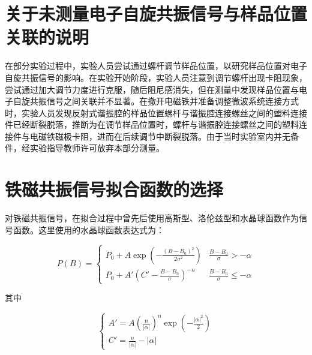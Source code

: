 \documentclass{thuemp}
\begin{document}
    {
    \renewcommand{\baselinestretch}{0.9}
    \liuhao
    
    
    }
    \newpage
    \appendix
    
    \section{关于未测量电子自旋共振信号与样品位置关联的说明}
    
    在部分实验过程中，实验人员尝试通过螺杆调节样品位置，以研究样品位置对电子自旋共振信号的影响。在实验开始阶段，实验人员注意到调节螺杆出现卡阻现象，尝试通过加大调节力度进行克服，随后阻尼感消失，但在测量中发现样品位置与电子自旋共振信号之间关联并不显著。在撤开电磁铁并准备调整微波系统连接方式时，实验人员发现反射式谐振腔的样品位置螺杆与谐振腔连接螺丝之间的塑料连接件已经断裂脱落，推断为在调节样品位置时，螺杆与谐振腔连接螺丝之间的塑料连接件与电磁铁磁极卡阻，进而在后续调节中断裂脱落。由于当时实验室内并无备件，经实验指导教师许可放弃本部分测量。
    
    \section{铁磁共振信号拟合函数的选择}
    
    对铁磁共振信号，在拟合过程中曾先后使用高斯型、洛伦兹型和水晶球函数作为信号函数。这里使用的水晶球函数表达式为：
    
        
    
    \begin{equation}
        P(B) = 
        \begin{cases}
            P_0 + A \exp\left( -\frac{(B - B_0)^2}{2\sigma^2} \right) & \frac{B - B_0}{\sigma} > -\alpha \\
            P_0 + A' \left( C' -\frac{B-B_0}{\sigma} \right)^{-n} & \frac{B - B_0}{\sigma} \leq -\alpha
        \end{cases}
        \label{eq:crystalball}
    \end{equation}
    
    其中
    
    \begin{equation}
        \begin{cases}
            A' = A \left( \frac n {|\alpha|}\right)^n \exp \left(-\frac{|\alpha|^2} 2\right) \\
        C' = \frac n {|\alpha|} - |\alpha|
        \end{cases}
    \end{equation}
\end{document}
